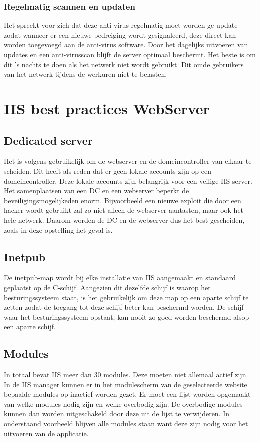 \documentclass[pdftex,a4paper,12pt]{report}
\begin{document}
\subsubsection{Regelmatig scannen en updaten}
Het spreekt voor zich dat deze anti-virus regelmatig moet worden ge-update zodat wanneer er een nieuwe bedreiging wordt gesignaleerd, deze direct kan worden toegevoegd  aan de anti-virus software. Door het dagelijks uitvoeren van updates en een anti-virusscan blijft de server optimaal beschermt. Het beste is om dit 's nachts te doen als het netwerk niet wordt gebruikt. Dit omde gebruikers van het netwerk tijdens de werkuren niet te belasten. 

\section{IIS best practices WebServer}
\subsection{Dedicated server}
Het is volgens \cite{Microsoft2013} gebruikelijk om de webserver en de domeincontroller van elkaar te scheiden. Dit heeft als reden dat er geen lokale accounts zijn op een domeincontroller. Deze lokale accounts zijn belangrijk voor een veilige IIS-server. Het samenplaatsen van een DC en een webserver beperkt de beveiligingsmogelijkeden enorm. Bijvoorbeeld een nieuwe exploit die door een hacker wordt gebruikt zal zo niet alleen de webserver aantasten, maar ook het hele netwerk. Daarom worden de DC en de webserver dus het best gescheiden, zoals in deze opstelling het geval is.

\subsection{Inetpub}
De inetpub-map wordt bij elke installatie van IIS aangemaakt en standaard geplaatst op de C-schijf. Aangezien dit dezelfde schijf is waarop het besturingssysteem staat, is het gebruikelijk om deze map op een aparte schijf te zetten zodat de toegang tot deze schijf beter kan beschermd worden. De schijf waar het besturingssysteem opstaat, kan nooit zo goed worden beschermd alsop een aparte schijf. \citep{Darmanin2014}

\subsection{Modules}
In totaal bevat IIS meer dan 30 modules. Deze moeten niet allemaal actief zijn. In de IIS manager kunnen er in het modulescherm van de geselecteerde website bepaalde modules op inactief worden gezet. Er moet een lijst worden opgemaakt van welke modules nodig zijn en welke overbodig zijn. De overbodige modules kunnen dan worden uitgeschakeld door deze uit de lijst te verwijderen. In onderstaand voorbeeld blijven alle modules staan want deze zijn nodig voor het uitvoeren van de applicatie. \citep{Darmanin2014} \citep{Microsoft2013}
\end{document}
